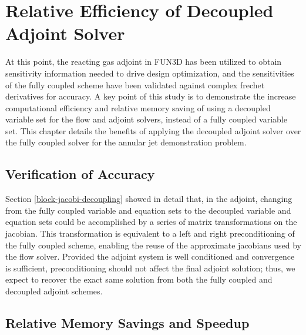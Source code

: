\chapter{Relative Efficiency of Decoupled Adjoint Solver}
\label{chapter-nine}

At this point, the reacting gas adjoint in FUN3D has been utilized to obtain
sensitivity information needed to drive design optimization, and the
sensitivities of the fully coupled scheme have been validated against complex
frechet derivatives for accuracy.  A key point of this study is to demonstrate
the increase computational efficiency and relative memory saving of using a
decoupled variable set for the flow and adjoint solvers, instead of a fully
coupled variable set.  This chapter details the benefits of applying the
decoupled adjoint solver over the fully coupled solver for the annular jet
demonstration problem.

\section{Verification of Accuracy}

Section \ref{block-jacobi-decoupling} showed in detail that, in the adjoint,
changing from the fully coupled variable and equation sets to the decoupled
variable and equation sets could be accomplished by a series of matrix
transformations on the jacobian.  This transformation is equivalent to a left
and right preconditioning of the fully coupled scheme, enabling the reuse of the
approximate jacobians used by the flow solver.  Provided the adjoint system is
well conditioned and convergence is sufficient, preconditioning should not
affect the final adjoint solution; thus, we expect to recover the exact same
solution from both the fully coupled and decoupled adjoint schemes.

\section{Relative Memory Savings and Speedup}

